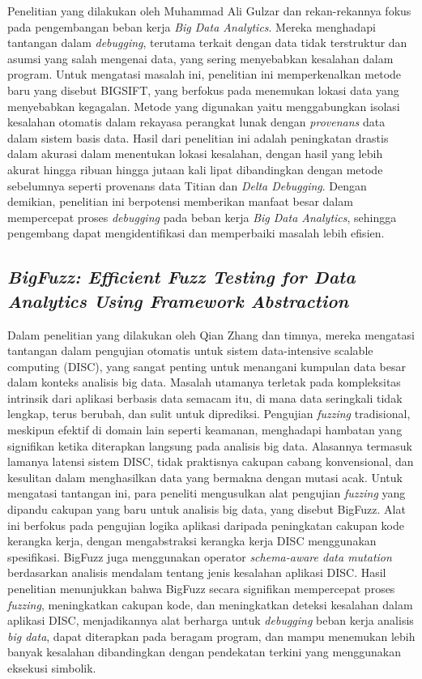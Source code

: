 Penelitian yang dilakukan oleh Muhammad Ali Gulzar dan rekan-rekannya fokus pada pengembangan beban kerja \emph{Big Data Analytics}. Mereka menghadapi tantangan dalam \emph{debugging}, terutama terkait dengan data tidak terstruktur dan asumsi yang salah mengenai data, yang sering menyebabkan kesalahan dalam program. Untuk mengatasi masalah ini, penelitian ini memperkenalkan metode baru yang disebut BIGSIFT, yang berfokus pada menemukan lokasi data yang menyebabkan kegagalan. Metode yang digunakan yaitu menggabungkan isolasi kesalahan otomatis dalam rekayasa perangkat lunak dengan \emph{provenans} data dalam sistem basis data. Hasil dari penelitian ini adalah peningkatan drastis dalam akurasi dalam menentukan lokasi kesalahan, dengan hasil yang lebih akurat hingga ribuan hingga jutaan kali lipat dibandingkan dengan metode sebelumnya seperti provenans data Titian dan \emph{Delta Debugging}. Dengan demikian, penelitian ini berpotensi memberikan manfaat besar dalam mempercepat proses \emph{debugging} pada beban kerja \emph{Big Data Analytics}, sehingga pengembang dapat mengidentifikasi dan memperbaiki masalah lebih efisien.

\subsection{\emph{BigFuzz: Efficient Fuzz Testing for Data Analytics Using Framework Abstraction}}
\label{subsec:BigFuzz: Efficient Fuzz Testing for Data Analytics Using Framework Abstraction}

Dalam penelitian yang dilakukan oleh Qian Zhang dan timnya, mereka mengatasi tantangan dalam pengujian otomatis untuk sistem data-intensive scalable computing (DISC), yang sangat penting untuk menangani kumpulan data besar dalam konteks analisis big data. Masalah utamanya terletak pada kompleksitas intrinsik dari aplikasi berbasis data semacam itu, di mana data seringkali tidak lengkap, terus berubah, dan sulit untuk diprediksi. Pengujian \emph{fuzzing} tradisional, meskipun efektif di domain lain seperti keamanan, menghadapi hambatan yang signifikan ketika diterapkan langsung pada analisis big data. Alasannya termasuk lamanya latensi sistem DISC, tidak praktisnya cakupan cabang konvensional, dan kesulitan dalam menghasilkan data yang bermakna dengan mutasi acak. Untuk mengatasi tantangan ini, para peneliti mengusulkan alat pengujian \emph{fuzzing} yang dipandu cakupan yang baru untuk analisis big data, yang disebut BigFuzz. Alat ini berfokus pada pengujian logika aplikasi daripada peningkatan cakupan kode kerangka kerja, dengan mengabstraksi kerangka kerja DISC menggunakan spesifikasi. BigFuzz juga menggunakan operator \emph{schema-aware data mutation} berdasarkan analisis mendalam tentang jenis kesalahan aplikasi DISC. Hasil penelitian menunjukkan bahwa BigFuzz secara signifikan mempercepat proses \emph{fuzzing}, meningkatkan cakupan kode, dan meningkatkan deteksi kesalahan dalam aplikasi DISC, menjadikannya alat berharga untuk \emph{debugging} beban kerja analisis \emph{big data}, dapat diterapkan pada beragam program, dan mampu menemukan lebih banyak kesalahan dibandingkan dengan pendekatan terkini yang menggunakan eksekusi simbolik.

